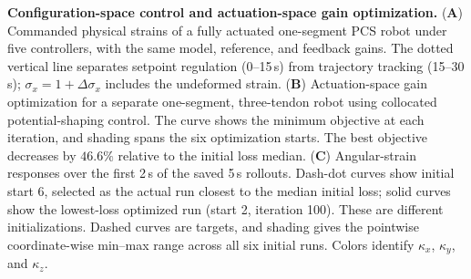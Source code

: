 \caption{\textbf{Configuration-space control and actuation-space gain optimization.}
(\textbf{A}) Commanded physical strains of a fully actuated one-segment PCS robot under five controllers, with the same model, reference, and feedback gains. The dotted vertical line separates setpoint regulation (0--15\,s) from trajectory tracking (15--30\,s); $\sigma_x=1+\Delta\sigma_x$ includes the undeformed strain.
(\textbf{B}) Actuation-space gain optimization for a separate one-segment, three-tendon robot using collocated potential-shaping control. The curve shows the minimum objective at each iteration, and shading spans the six optimization starts. The best objective decreases by $46.6\%$ relative to the initial loss median.
(\textbf{C}) Angular-strain responses over the first 2\,s of the saved 5\,s rollouts. Dash-dot curves show initial start 6, selected as the actual run closest to the median initial loss; solid curves show the lowest-loss optimized run (start 2, iteration 100). These are different initializations. Dashed curves are targets, and shading gives the pointwise coordinate-wise min--max range across all six initial runs. Colors identify $\kappa_x$, $\kappa_y$, and $\kappa_z$.}

